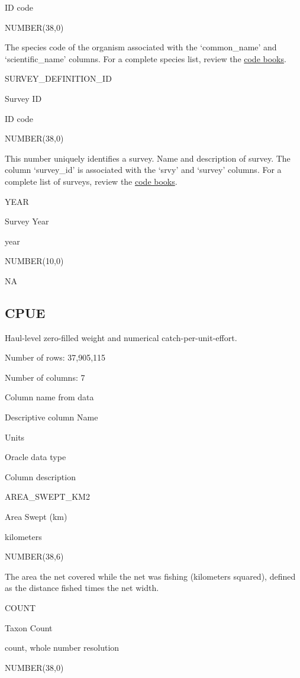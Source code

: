 \documentclass[
  letterpaper,
  oneside,
  open=any]{scrbook}
\begin{document}
ID code

NUMBER(38,0)

The species code of the organism associated with the `common\_name' and
`scientific\_name' columns. For a complete species list, review the
\href{https://www.fisheries.noaa.gov/resource/document/groundfish-survey-species-code-manual-and-data-codes-manual}{code
books}.

SURVEY\_DEFINITION\_ID

Survey ID

ID code

NUMBER(38,0)

This number uniquely identifies a survey. Name and description of
survey. The column `survey\_id' is associated with the `srvy' and
`survey' columns. For a complete list of surveys, review the
\href{https://www.fisheries.noaa.gov/resource/document/groundfish-survey-species-code-manual-and-data-codes-manual}{code
books}.

YEAR

Survey Year

year

NUMBER(10,0)

NA

\hypertarget{cpue}{%
\subsection{CPUE}\label{cpue}}

Haul-level zero-filled weight and numerical catch-per-unit-effort.

Number of rows: 37,905,115

Number of columns: 7

Column name from data

Descriptive column Name

Units

Oracle data type

Column description

AREA\_SWEPT\_KM2

Area Swept (km)

kilometers

NUMBER(38,6)

The area the net covered while the net was fishing (kilometers squared),
defined as the distance fished times the net width.

COUNT

Taxon Count

count, whole number resolution

NUMBER(38,0)
\end{document}

